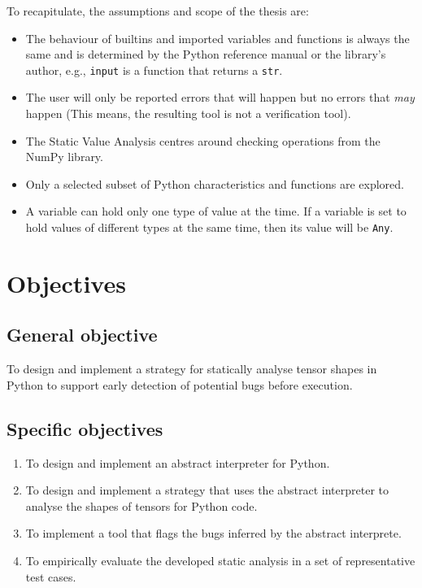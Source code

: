\documentclass[
11pt, %
english, %
singlespacing, %
headsepline, %
]{MastersDoctoralThesis} %
\providecommand{\tightlist}{%
  \setlength{\itemsep}{0pt}\setlength{\parskip}{0pt}}
\begin{document}
To recapitulate, the assumptions and scope of the thesis are:

\begin{itemize}
\tightlist
\item
  The behaviour of builtins and imported variables and functions is
  always the same and is determined by the Python reference manual or
  the library's author, e.g., \texttt{input} is a function that returns
  a \texttt{str}.
\item
  The user will only be reported errors that will happen but no errors
  that \emph{may} happen (This means, the resulting tool is not a
  verification tool).
\item
  The Static Value Analysis centres around checking operations from the
  NumPy library.
\item
  Only a selected subset of Python characteristics and functions are
  explored.
\item
  A variable can hold only one type of value at the time. If a variable
  is set to hold values of different types at the same time, then its
  value will be \texttt{Any}.
\end{itemize}

\hypertarget{objectives}{%
\section{Objectives}\label{objectives}}

\hypertarget{general-objective}{%
\subsection{General objective}\label{general-objective}}

To design and implement a strategy for statically analyse tensor shapes
in Python to support early detection of potential bugs before execution.

\hypertarget{specific-objectives}{%
\subsection{Specific objectives}\label{specific-objectives}}

\begin{enumerate}
\def\labelenumi{\arabic{enumi}.}
\tightlist
\item
  To design and implement an abstract interpreter for Python.
\item
  To design and implement a strategy that uses the abstract interpreter
  to analyse the shapes of tensors for Python code.
\item
  To implement a tool that flags the bugs inferred by the abstract
  interprete.
\item
  To empirically evaluate the developed static analysis in a set of
  representative test cases.
\end{enumerate}
\end{document}
